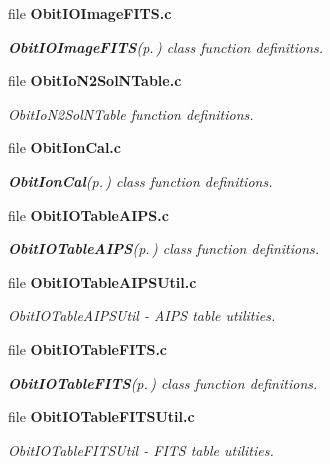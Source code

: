 \begin{CompactItemize}
\item 
file {\bf Obit\-IOImage\-FITS.c}
\begin{CompactList}\small\item\em {\bf Obit\-IOImage\-FITS}{\rm (p.\,\pageref{structObitIOImageFITS})} class function definitions. \item\end{CompactList}

\item 
file {\bf Obit\-Io\-N2Sol\-NTable.c}
\begin{CompactList}\small\item\em Obit\-Io\-N2Sol\-NTable function definitions. \item\end{CompactList}

\item 
file {\bf Obit\-Ion\-Cal.c}
\begin{CompactList}\small\item\em {\bf Obit\-Ion\-Cal}{\rm (p.\,\pageref{structObitIonCal})} class function definitions. \item\end{CompactList}

\item 
file {\bf Obit\-IOTable\-AIPS.c}
\begin{CompactList}\small\item\em {\bf Obit\-IOTable\-AIPS}{\rm (p.\,\pageref{structObitIOTableAIPS})} class function definitions. \item\end{CompactList}

\item 
file {\bf Obit\-IOTable\-AIPSUtil.c}
\begin{CompactList}\small\item\em Obit\-IOTable\-AIPSUtil - AIPS table utilities. \item\end{CompactList}

\item 
file {\bf Obit\-IOTable\-FITS.c}
\begin{CompactList}\small\item\em {\bf Obit\-IOTable\-FITS}{\rm (p.\,\pageref{structObitIOTableFITS})} class function definitions. \item\end{CompactList}

\item 
file {\bf Obit\-IOTable\-FITSUtil.c}
\begin{CompactList}\small\item\em Obit\-IOTable\-FITSUtil - FITS table utilities. \item\end{CompactList}


\end{CompactItemize}
